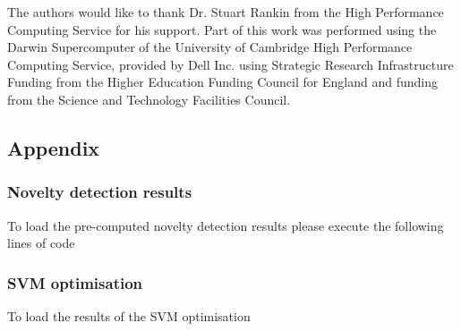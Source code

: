 The authors would like to thank Dr. Stuart Rankin from the High
Performance Computing Service for his support. Part of this work was
performed using the Darwin Supercomputer of the University of
Cambridge High Performance Computing Service, provided by Dell
Inc. using Strategic Research Infrastructure Funding from the Higher
Education Funding Council for England and funding from the Science and
Technology Facilities Council.

\subsection*{Appendix}

\subsubsection*{Novelty detection results}

To load the pre-computed novelty detection results please execute the
following lines of code

\begin{knitrout}
\color{fgcolor}\begin{kframe}
\begin{alltt}
 \hlkwb{<-}   \hlstd{=} \hlstd{,}
           \hlstd{=} \hlstd{)}
 \hlkwb{<-} 
 \hlkwb{<-}   \hlstd{=} \hlstd{,}  \hlstd{=} \hlstd{)}
\end{alltt}
\end{kframe}
\end{knitrout}

\subsubsection*{SVM optimisation}

To load the results of the SVM optimisation 

\begin{knitrout}
\color{fgcolor}\begin{kframe}
\begin{alltt}
 \hlkwb{<-}   \hlstd{=} \hlstd{,}
               \hlstd{=} \hlstd{)}
 \hlkwb{<-} 
\end{alltt}
\end{kframe}
\end{knitrout}

